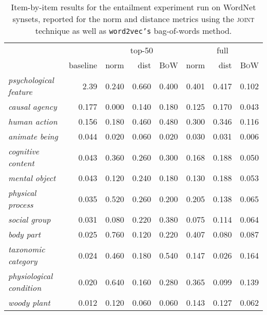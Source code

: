 \begin{table}
\centering
\begin{tabular}{lr|rrr|rrr}
\hline
\multicolumn{2}{c}{} & \multicolumn{3}{c}{top-50} & \multicolumn{3}{c}{full} \\
& \multicolumn{1}{r}{baseline} & norm & dist & \multicolumn{1}{r}{\textsc{BoW}} & norm & dist & \textsc{BoW} \\
\hline
\emph{psychological feature} & 2.39 & 0.240 & 0.660 & 0.400 & 0.401 & 0.417 & 0.102 \\
\emph{causal agency} & 0.177 & 0.000 & 0.140 & 0.180 & 0.125 & 0.170 & 0.043 \\
\emph{human action} & 0.156 & 0.180 & 0.460 & 0.480 & 0.300 & 0.346 & 0.116 \\
\emph{animate being} & 0.044 & 0.020 & 0.060 & 0.020 & 0.030 & 0.031 & 0.006 \\
\emph{cognitive content} & 0.043 & 0.360 & 0.260 & 0.300 & 0.168 & 0.188 & 0.050 \\
\emph{mental object} & 0.043 & 0.120 & 0.240 & 0.180 & 0.130 & 0.188 & 0.053 \\
\emph{physical process} & 0.035 & 0.520 & 0.260 & 0.200 & 0.205 & 0.138 & 0.065 \\
\emph{social group} & 0.031 & 0.080 & 0.220 & 0.380 & 0.075 & 0.114 & 0.064 \\
\emph{body part} & 0.025 & 0.760 & 0.120 & 0.220 & 0.407 & 0.080 & 0.087 \\
\emph{taxonomic category} & 0.024 & 0.460 & 0.180 & 0.540 & 0.147 & 0.026 & 0.164 \\
\emph{physiological condition} & 0.020 & 0.640 & 0.160 & 0.280 & 0.365 & 0.099 & 0.139 \\
\emph{woody plant} & 0.012 & 0.120 & 0.060 & 0.060 & 0.143 & 0.127 & 0.062 \\
\hline
\end{tabular}
\caption[WordNet   Scores for Two Techniques]{Item-by-item   results for the entailment experiment run on WordNet synsets, reported for the norm and distance metrics using the \textsc{joint} technique as well as \texttt{word2vec's} bag-of-words method.}
\label{tab:wnitems}
\end{table}

